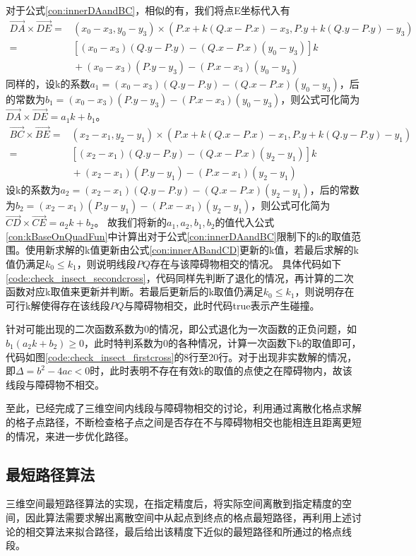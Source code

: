 \par 对于公式\ref{con:innerDAandBC}，相似的有，我们将点E坐标代入有
\begin{align*} 
    \vec{DA}\times\vec{DE} = {}& (x_0-x_3,y_0-y_3)\times(P.x+k(Q.x-P.x)-x_3,P.y+k(Q.y-P.y)-y_3) \\ 
    = {}& [(x_0-x_3)(Q.y-P.y)-(Q.x-P.x)(y_0-y_3)]k  \\ 
    &{} +(x_0-x_3)(P.y-y_3)-(P.x-x_3)(y_0-y_3) 
\end{align*}
同样的，设k的系数$a_1=(x_0-x_3)(Q.y-P.y)-(Q.x-P.x)(y_0-y_3)$，后的常数为$b_1=(x_0-x_3)(P.y-y_3)-(P.x-x_3)(y_0-y_3)$，则公式可化简为$\vec{DA}\times\vec{DE} = a_1k+b_1$。
\begin{align*} 
    \vec{BC}\times\vec{BE} = {}& (x_2-x_1,y_2-y_1)\times(P.x+k(Q.x-P.x)-x_1,P.y+k(Q.y-P.y)-y_1) \\ 
    = {}& [(x_2-x_1)(Q.y-P.y)-(Q.x-P.x)(y_2-y_1)]k  \\ 
    &{} +(x_2-x_1)(P.y-y_1)-(P.x-x_1)(y_2-y_1) 
\end{align*}
设k的系数为$a_2=(x_2-x_1)(Q.y-P.y)-(Q.x-P.x)(y_2-y_1)$，后的常数为$b_2=(x_2-x_1)(P.y-y_1)-(P.x-x_1)(y_2-y_1)$，则公式可化简为$\vec{CD}\times\vec{CE} = a_2k+b_2$。
故我们将新的$a_1,a_2,b_1,b_2$的值代入公式\ref{con:kBaseOnQuadFun}中计算出对于公式\ref{con:innerDAandBC}限制下的k的取值范围。使用新求解的k值更新由公式\ref{con:innerABandCD}更新的k值，若最后求解的k值仍满足$k_0\leq k_1$，则说明线段$PQ$存在与该障碍物相交的情况。
具体代码如下\ref{code:check_insect_secondcross}，代码同样先判断了退化的情况，再计算的二次函数对应k取值来更新并判断。若最后更新后的k取值仍满足$k_0\leq k_1$，则说明存在可行k解使得存在该线段$PQ$与障碍物相交，此时代码true表示产生碰撞。

\par 针对可能出现的二次函数系数为0的情况，即公式退化为一次函数的正负问题，如$b_1(a_2k+b_2)\ge 0$，此时特判系数为0的各种情况，计算一次函数下k的取值即可，代码如图\ref{code:check_insect_firstcross}的8行至20行。对于出现非实数解的情况，即$\Delta=b^2-4ac<0$时，此时表明不存在有效k的取值的点使之在障碍物内，故该线段与障碍物不相交。
\par 至此，已经完成了三维空间内线段与障碍物相交的讨论，利用通过离散化格点求解的格子点路径，不断检查格子点之间是否存在不与障碍物相交也能相连且距离更短的情况，来进一步优化路径。

\subsection{最短路径算法}
\par 三维空间最短路径算法的实现，在指定精度后，将实际空间离散到指定精度的空间，因此算法需要求解出离散空间中从起点到终点的格点最短路径，再利用上述讨论的相交算法来拟合路径，最后给出该精度下近似的最短路径和所通过的格点线段。
